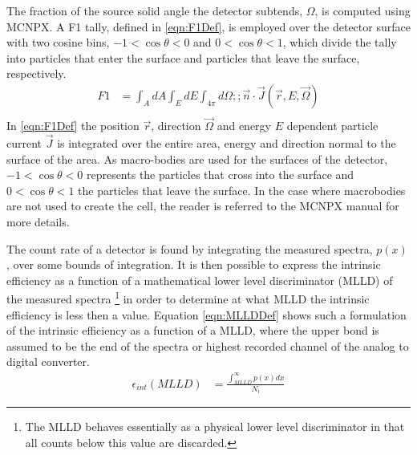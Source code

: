 \documentclass[draftcls,onecolumn]{IEEEtran}
\begin{document}
The fraction of the source solid angle the detector subtends, $\Omega$, is computed using MCNPX. 
A F1 tally, defined in \eqref{eqn:F1Def}, is employed over the detector surface with two cosine bins, $-1<\cos\theta<0$ and $0<\cos\theta<1$, which divide the tally into particles that enter the surface and particles that leave the surface, respectively.
\begin{align}
  \label{eqn:F1Def}
  F1 &= \int_A dA \int_E dE \int_{4\pi} d\Omega ;;\vec{n}\cdot\vec{J}(\vec{r},E,\vec{\Omega}) \\
\end{align}
In \eqref{eqn:F1Def} the position $\vec{r}$, direction $\vec{\Omega}$ and energy $E$  dependent particle current $\vec{J}$  is integrated over the entire area, energy and direction normal to the surface of the area.
As macro-bodies are used for the surfaces of the detector, $-1<\cos\theta<0$ represents the particles that cross into the surface and $0<\cos\theta<1$ the particles that leave the surface.
In the case where macrobodies are not used to create the cell, the reader is referred to the MCNPX manual for more details.

The count rate of a detector is found by integrating the measured spectra, $p(x)$,  over some bounds of integration.
It is then possible to express the intrinsic efficiency as a function of a mathematical lower level discriminator (MLLD) of the measured spectra \footnote{The MLLD behaves essentially as a physical lower level discriminator in that all counts below this value are discarded.} in order to determine at what MLLD the intrinsic efficiency is less then a value.
Equation \eqref{eqn:MLLDDef} shows such a formulation of the intrinsic efficiency as a function of a MLLD, where the upper bond is assumed to be the end of the spectra or highest recorded channel of the analog to digital converter.
\begin{align}
	\label{eqn:MLLDDef}
	\epsilon_{int}(MLLD) &= \frac{\int_{MLLD}^\infty p(x)dx}{N_i}
\end{align}
\end{document}
